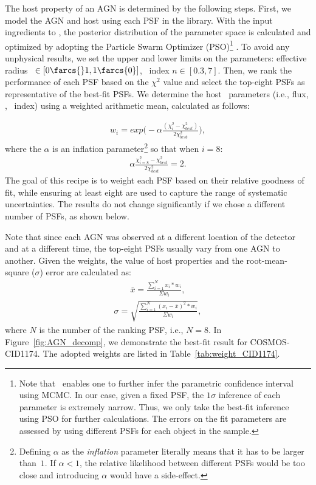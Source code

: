 \documentclass[apj]{emulateapj}
\begin{document}

The host property of an AGN is determined by the following steps. First, we model the AGN and host using each PSF in the library. With the input ingredients to \lenstronomy, the posterior distribution of the parameter space is calculated and optimized by adopting the Particle Swarm Optimizer (PSO)\footnote{Note that \lenstronomy\ enables one to further infer the parametric confidence interval using MCMC. In our case, given a fixed PSF, the $1\sigma$ inference of each parameter is extremely narrow. Thus, we only take the best-fit inference using PSO for further calculations. The errors on the fit parameters are assessed by using different PSFs for each object in the sample.} \citep{PSO}.
To avoid any unphysical results, we set the upper and lower limits on the parameters: effective radius \Reff~$\in[0\farcs{}1,1\farcs{0}]$, \sersic\ index $n\in[0.3,7]$.
Then, we rank the performance of each PSF based on the $\chi^2$ value and select the top-eight PSFs as representative of the best-fit PSFs. We determine the host \sersic\ parameters (i.e., flux, \Reff, \sersic\ index) using a weighted arithmetic mean, calculated as follows:

\begin{eqnarray}
\label{eq:weights}
w_i = exp \big(- \alpha \frac{ (\chi_i ^2 - \chi_{best} ^2 )}{2 \chi_{best} ^2} \big),
\end{eqnarray} 
where the $\alpha$ is an inflation parameter\footnote{Defining $\alpha$ as the {\it inflation} parameter literally means that it has to be larger than~$1$. If $\alpha<1$, the relative likelihood between different PSFs would be too close and introducing $\alpha$ would have a side-effect.} so that when $i=8$:
\begin{eqnarray}
\label{eq:alpha}
\alpha \frac{ \chi_{i=8} ^2 - \chi_{best} ^2 }{2 \chi_{best} ^2} = 2.
\end{eqnarray} 
The goal of this recipe is to weight each PSF based on their relative goodness of fit, while ensuring at least eight are used to capture the range of systematic uncertainties. The results do not change significantly if we chose a different number of PSFs, as shown below.

Note that since each AGN was observed at a different location of the detector and at a different time, the top-eight PSFs usually vary from one AGN to another. Given the weights, the value of host properties and the root-mean-square ($\sigma$) error are calculated as:
\begin{eqnarray}
\label{eq:infer_value}
\bar{x}  =  \frac{  \sum_{i=1}^{N}   x_i * w_i  }{\Sigma w_i} ,
\end{eqnarray} 
\begin{eqnarray}
\label{eq:infer_scatter}
\sigma =   \sqrt{ \frac{  \sum_{i=1}^{N}   (x_i -  \bar{x} ) ^2 * w_i  }{\Sigma w_i} },
\end{eqnarray} 
where $N$ is the number of the ranking PSF, i.e., $N=8$.
\noindent In Figure~\ref{fig:AGN_decomp}, we demonstrate the best-fit result for COSMOS-CID1174. The adopted weights are listed in Table~\ref{tab:weight_CID1174}. 
\end{document}
